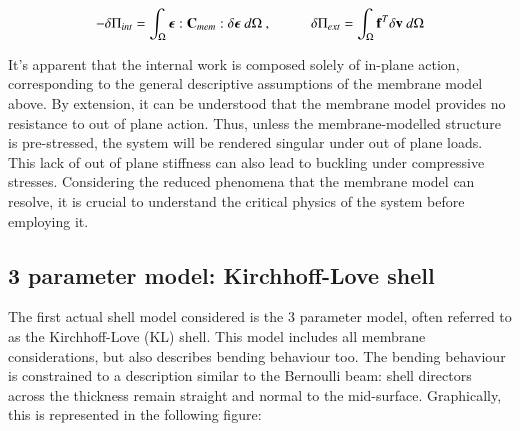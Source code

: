 \begin{equation} 
-\delta\Pi_{int} = 
\int_\Omega
\boldsymbol{\epsilon}
:
\mathbf{C}_{mem}
:
\delta \boldsymbol{\epsilon}\ 
d \Omega\ ,
\hspace{10mm}
\delta\Pi_{ext} = \int_\Omega
\mathbf{f}^T
\delta  \mathbf{v}\ 
d \Omega
\label{eqsmem5}
\end{equation}

%


It's apparent that the internal work is composed solely of in-plane action, corresponding to the general descriptive assumptions of the membrane model above. By extension, it can be understood that the membrane model provides no resistance to out of plane action. Thus, unless the membrane-modelled structure is pre-stressed, the system will be rendered singular under out of plane loads. This lack of out of plane stiffness can also lead to buckling under compressive stresses. Considering the reduced phenomena that the membrane model can resolve, it is crucial to understand the critical physics of the system before employing it.

\subsection{3 parameter model: Kirchhoff-Love shell}

The first actual shell model considered is the 3 parameter model, often referred to as the Kirchhoff-Love (KL) shell. This model includes all membrane considerations, but also describes bending behaviour too. The bending behaviour is constrained to a description similar to the Bernoulli beam: shell directors across the thickness remain straight and normal to the mid-surface. Graphically, this is represented in the following figure:

